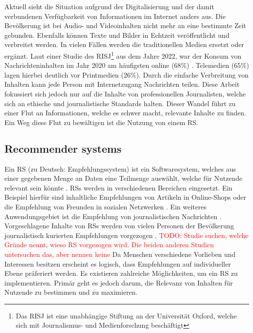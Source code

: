 Aktuell sieht die Situation aufgrund der Digitalisierung und der damit verbundenen Verfügbarkeit von Informationen im Internet anders aus.
Die Bevölkerung ist bei Audio- und Videoinhalten nicht mehr an eine bestimmte Zeit gebunden.
Ebenfalls können Texte und Bilder in Echtzeit veröffentlicht und verbreitet werden.
In vielen Fällen werden die traditionellen Medien ersetzt oder ergänzt.
Laut einer Studie des \ac{RISJ}\footnote{Das \ac{RISJ} ist eine unabhängige Stiftung an der Universität Oxford, welche sich mit Journalismus- und Medienforschung beschäftigt} aus dem Jahre 2022, war der Konsum von Nachrichteninhalten im Jahr 2020 am häufigsten online ($68\%$) \cite{reuters-2022}.
Telemedien ($65\%$) lagen hierbei deutlich vor Printmedien ($26\%$).
Durch die einfache Verbreitung von Inhalten kann jede Person mit Internetzugang Nachrichten teilen.
Diese Arbeit fokussiert sich jedoch nur auf die Inhalte von professionellen Journalisten, welche sich an ethische und journalistische Standards halten.
Dieser Wandel führt zu einer Flut an Informationen, welche es schwer macht, relevante Inhalte zu finden.
Ein Weg diese Flut zu bewältigen ist die Nutzung von einem \ac{RS}.

\subsection{Recommender systems}
Ein \acf{RS} (zu Deutsch: Empfehlungssystem) ist ein Softwaresystem, welches aus einer gegebenen Menge an Daten eine Teilmenge auswählt, welche für Nutzende relevant sein könnte \cite{recommender-systems}.
\acp{RS} werden in verschiedenen Bereichen eingesetzt.
Ein Beispiel hierfür sind inhaltliche Empfehlungen von Artikeln in Online-Shops oder die Empfehlung von Freunden in sozialen Netzwerken \cite{ecommerce-recommender, social-recommender}.
Ein weiteres Anwendungsgebiet ist die Empfehlung von journalistischen Nachrichten \cite{news-recommender}.
Vorgeschlagene Inhalte von \acp{RS} werden von vielen Personen der Bevölkerung journalistisch kurierten Empfehlungen vorgezogen \cite{recommender-preference, theory-of-machine}.
\textcolor{red}{TODO: Studie suchen, welche Gründe nennt, wieso RS vorgezogen wird. Die beiden anderen Studien untersuchen das, aber nennen keine}
Da Menschen verschiedene Vorlieben und Interessen besitzen erscheint es logisch, dass Empfehlungen auf individueller Ebene präferiert werden.
Es existieren zahlreiche Möglichkeiten, um ein \ac{RS} zu implementieren.
Primär geht es jedoch darum, die Relevanz von Inhalten für Nutzende zu bestimmen und zu maximieren. \\

